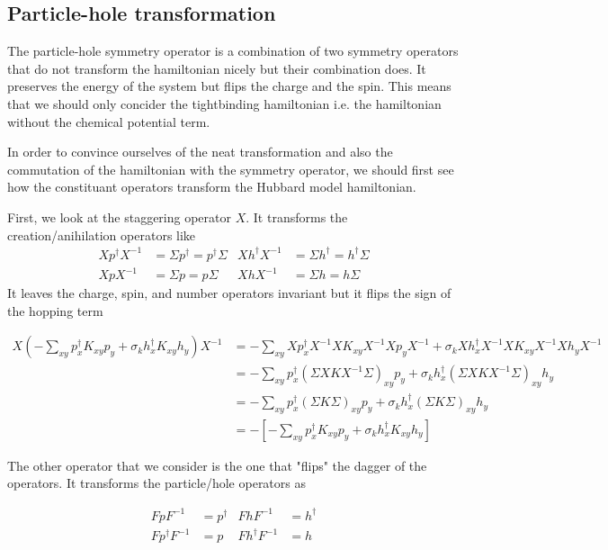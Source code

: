 \subsection{Particle-hole transformation}

The particle-hole symmetry operator is a combination of two symmetry operators that do not transform the hamiltonian nicely but their combination does. It preserves the energy of the system but flips the charge and the spin. This means that we should only concider the tightbinding hamiltonian i.e. the hamiltonian without the chemical potential term.

In order to convince ourselves of the neat transformation and also the commutation of the hamiltonian with the symmetry operator, we should first see how the constituant operators transform the Hubbard model hamiltonian.

First, we look at the staggering operator $X$. It transforms the creation/anihilation operators like
\begin{align*}
  Xp^\dagger X^{-1} &= \Sigma p^\dagger = p^\dagger \Sigma & Xh^\dagger X^{-1} &= \Sigma h^\dagger = h^\dagger \Sigma \\
  Xp X^{-1} &= \Sigma p = p \Sigma & XhX^{-1} &= \Sigma h = h \Sigma
\end{align*}
It leaves the charge, spin, and number operators invariant but it flips the sign of the hopping term

\begin{align*}
  X\left( -\sum_{xy} p^\dagger_x K_{xy} p_y + \sigma_k h^\dagger_x K_{xy} h_y\right) X^{-1} &= -\sum_{xy} X p^\dagger_x X^{-1}X K_{xy} X^{-1}X p_y X^{-1} + \sigma_k X h^\dagger_x X^{-1}X K_{xy} X^{-1}X h_y X^{-1}
  \\
  &= -\sum_{xy}  p^\dagger_x (\Sigma X K X^{-1}\Sigma)_{xy} p_y + \sigma_k h^\dagger_x (\Sigma X K X^{-1}\Sigma)_{xy} h_y
  \\
  &= -\sum_{xy}  p^\dagger_x (\Sigma K \Sigma)_{xy} p_y + \sigma_k h^\dagger_x (\Sigma K \Sigma)_{xy} h_y
  \\
  &= -\left[-\sum_{xy} p^\dagger_x K_{xy} p_y + \sigma_k h^\dagger_x K_{xy} h_y \right]
\end{align*}

The other operator that we consider is the one that "flips" the dagger of the operators. It transforms the particle/hole operators as

\begin{align*}
  FpF^{-1} &= p^\dagger & FhF^{-1} &= h^\dagger \\
  Fp^\dagger F^{-1} &= p & Fh^\dagger F^{-1} &= h
\end{align*}

